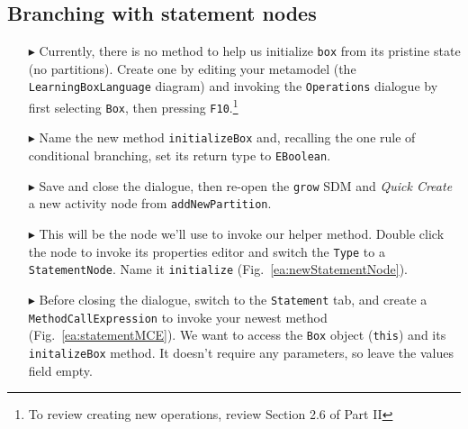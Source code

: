 \clearpage
\hypertarget{conBran vis}{}
\subsection{Branching with statement nodes}
\visHeader

\begin{itemize}

\item[$\blacktriangleright$] Currently, there is no method to help us initialize \texttt{box} from its pristine state (no partitions). Create one by editing
your metamodel (the \texttt{LearningBoxLanguage} diagram) and invoking the \texttt{Operations} dialogue by first selecting \texttt{Box}, then pressing
\texttt{F10}.\footnote{To review creating new operations, review Section 2.6 of Part II}

\item[$\blacktriangleright$] Name the new method \texttt{initializeBox} and, recalling the one rule of conditional branching, set its return type to
\texttt{EBoolean}.

\item[$\blacktriangleright$] Save and close the dialogue, then re-open the \texttt{grow} SDM and \emph{Quick Create} a new activity node from
\texttt{addNewPartition}.

\item[$\blacktriangleright$] This will be the node we'll use to invoke our helper method. Double click the node to invoke its properties editor and switch the
\texttt{Type} to a \texttt{StatementNode}. Name it \texttt{initialize} (Fig.~\ref{ea:newStatementNode}).

\item[$\blacktriangleright$] Before closing the dialogue, switch to the \texttt{Statement} tab, and create a \texttt{MethodCallExpression} to invoke your newest
method (Fig.~\ref{ea:statementMCE}). We want to access the \texttt{Box} object (\texttt{this}) and its \texttt{initalizeBox} method. It doesn't require any
parameters, so leave the values field empty. 

\begin{figure}[htbp]
   \centering
      \caption{}
\end{figure}
\FloatBarrier


\end{itemize}
